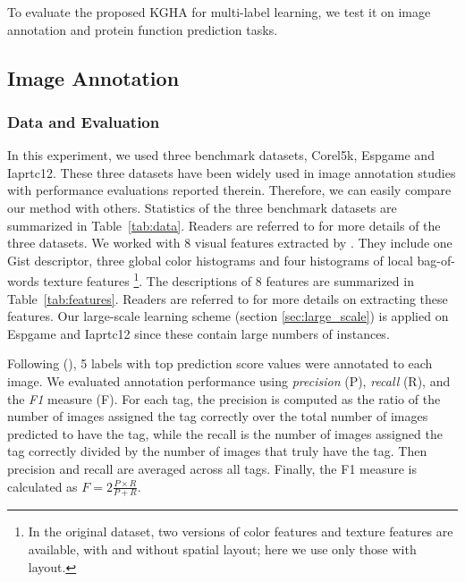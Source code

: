 \documentclass[a4paper]{article}
\begin{document}
To evaluate the proposed KGHA for multi-label learning, we test it on image annotation and protein function prediction tasks.  
\subsection{Image Annotation}
\subsubsection{Data and Evaluation}
In this experiment, we used three benchmark datasets, \textsf{Corel5k}, \textsf{Espgame} and \textsf{Iaprtc12}. 
These three datasets have been widely used in image annotation studies \citep{GMVS09,baseline,chen_2013_icml} with 
performance evaluations reported therein.  Therefore, we can easily compare our method with others.   
Statistics of the three benchmark datasets are summarized in Table~\ref{tab:data}.
Readers are referred to \citet{baseline} for more details of the three datasets.  
We worked with 8 visual features extracted by \citet{GMVS09}.
They include one Gist descriptor, three global color histograms and four histograms of local bag-of-words texture features%
\footnote{In the original dataset, two versions of color features 
and texture features are available, with and without spatial layout; here we use only those with layout.}. The descriptions of 8 features are 
summarized in Table~\ref{tab:features}. Readers are referred to \citet{GMVS09} for more details on extracting these features.
Our large-scale learning scheme (section \ref{sec:large_scale}) is applied on \textsf{Espgame} and \textsf{Iaprtc12} since these contain large numbers of instances.    

Following \citeauthor{chen_2013_icml} (\citeyear{chen_2013_icml}), 5 labels with top prediction 
score values were annotated to each image. We evaluated annotation performance using \emph{precision} (P), \emph{recall} (R), and the \emph{F1} measure (F). For each tag, the precision is 
computed as the ratio of the number of images assigned the tag correctly over the total number of images predicted to have the tag, while the recall is the number of images 
assigned the tag correctly divided by the number of images that truly have the tag. Then precision and recall are averaged across all tags. Finally, the F1 measure is calculated as 
$F=2\frac{P\times R}{P+R}$.
\end{document}
